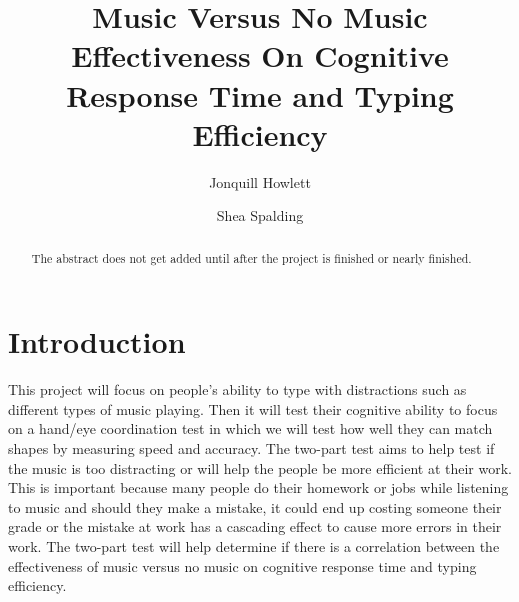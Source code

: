 \documentclass[manuscript, screen, review]{acmart} %
\begin{document}
\title{Music Versus No Music Effectiveness On Cognitive Response Time and Typing Efficiency}

\author{Jonquill Howlett}

\author{Shea Spalding}

\renewcommand{\shortauthors}{Howlett, Spalding}

\begin{abstract}
The abstract does not get added until after the project is finished or nearly finished.
\end{abstract}

\maketitle

\section{Introduction}
This project will focus on people's ability to type with distractions such as different types of music playing. Then it will test their cognitive ability to focus on a hand/eye coordination test in which we will test how well they can match shapes by measuring speed and accuracy. 
The two-part test aims to help test if the music is too distracting or will help the people be more efficient at their work. 
This is important because many people do their homework or jobs while listening to music and should they make a mistake, it could end up costing someone their grade or the mistake at work has a cascading effect to cause more errors in their work. 
The two-part test will help determine if there is a correlation between the effectiveness of music versus no music on cognitive response time and typing efficiency.
\end{document}

